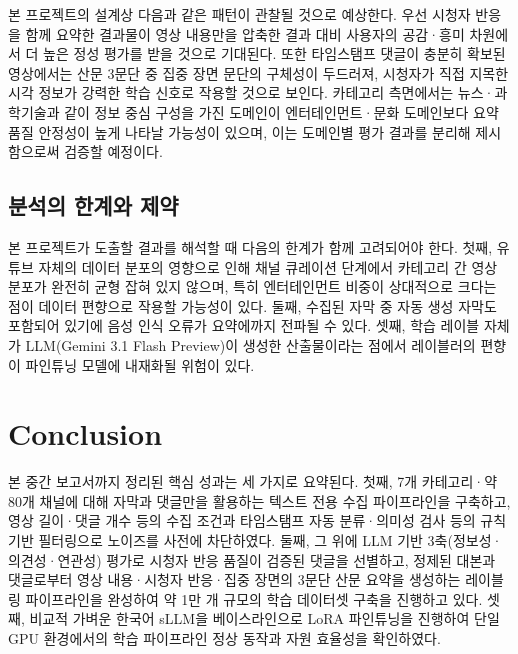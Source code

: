 \documentclass[11pt,a4paper]{article}
\begin{document}
본 프로젝트의 설계상 다음과 같은 패턴이 관찰될 것으로 예상한다. 우선 시청자 반응을 함께 요약한 결과물이 영상 내용만을 압축한 결과 대비 사용자의 공감·흥미 차원에서 더 높은 정성 평가를 받을 것으로 기대된다. 또한 타임스탬프 댓글이 충분히 확보된 영상에서는 산문 3문단 중 집중 장면 문단의 구체성이 두드러져, 시청자가 직접 지목한 시각 정보가 강력한 학습 신호로 작용할 것으로 보인다. 카테고리 측면에서는 뉴스·과학기술과 같이 정보 중심 구성을 가진 도메인이 엔터테인먼트·문화 도메인보다 요약 품질 안정성이 높게 나타날 가능성이 있으며, 이는 도메인별 평가 결과를 분리해 제시함으로써 검증할 예정이다.

\subsection{분석의 한계와 제약}

본 프로젝트가 도출할 결과를 해석할 때 다음의 한계가 함께 고려되어야 한다. 첫째, 유튜브 자체의 데이터 분포의 영향으로 인해 채널 큐레이션 단계에서 카테고리 간 영상 분포가 완전히 균형 잡혀 있지 않으며, 특히 엔터테인먼트 비중이 상대적으로 크다는 점이 데이터 편향으로 작용할 가능성이 있다. 둘째, 수집된 자막 중 자동 생성 자막도 포함되어 있기에 음성 인식 오류가 요약에까지 전파될 수 있다. 셋째, 학습 레이블 자체가 LLM(Gemini 3.1 Flash Preview)이 생성한 산출물이라는 점에서 레이블러의 편향이 파인튜닝 모델에 내재화될 위험이 있다.

\section{Conclusion}\label{sec:conclusion}

본 중간 보고서까지 정리된 핵심 성과는 세 가지로 요약된다. 첫째, 7개 카테고리·약 80개 채널에 대해 자막과 댓글만을 활용하는 텍스트 전용 수집 파이프라인을 구축하고, 영상 길이·댓글 개수 등의 수집 조건과 타임스탬프 자동 분류·의미성 검사 등의 규칙 기반 필터링으로 노이즈를 사전에 차단하였다. 둘째, 그 위에 LLM 기반 3축(정보성·의견성·연관성) 평가로 시청자 반응 품질이 검증된 댓글을 선별하고, 정제된 대본과 댓글로부터 영상 내용·시청자 반응·집중 장면의 3문단 산문 요약을 생성하는 레이블링 파이프라인을 완성하여 약 1만 개 규모의 학습 데이터셋 구축을 진행하고 있다. 셋째, 비교적 가벼운 한국어 sLLM을 베이스라인으로 LoRA 파인튜닝을 진행하여 단일 GPU 환경에서의 학습 파이프라인 정상 동작과 자원 효율성을 확인하였다.
\end{document}
